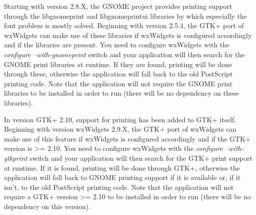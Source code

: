 Starting with version 2.8.X, the GNOME project provides printing
support through the libgnomeprint and libgnomeprintui libraries
by which especially the font problem is mostly solved. Beginning
with version 2.5.4, the GTK+ port of wxWidgets can make use of
these libraries if wxWidgets is configured accordingly and if the
libraries are present. You need to configure wxWidgets with the
{\it configure --with-gnomeprint} switch and your application will
then search for the GNOME print libraries at runtime. If they
are found, printing will be done through these, otherwise the
application will fall back to the old PostScript printing code.
Note that the application will not require the GNOME print libraries
to be installed in order to run (there will be no dependency on
these libraries).

In version GTK+ 2.10, support for printing has been added to GTK+ 
itself. Beginning with version wxWidgets 2.9.X, the GTK+ port of 
wxWidgets can make use of this feature
if wxWidgets is configured accordingly and if the GTK+ version is >= 2.10.
You need to configure wxWidgets with the {\it configure --with-gtkprint}
switch and your application will then search for the GTK+ print support
at runtime. If it is found, printing will be done through GTK+, otherwise the
application will fall back to GNOME printing support if it is available or,
if it isn't, to the old PostScript printing code.
Note that the application will not require a GTK+ version >= 2.10
to be installed in order to run (there will be no dependency on
this version).

